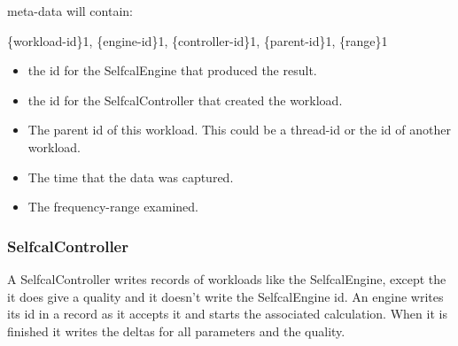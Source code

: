 \documentclass[]{lofar}
\begin{document}
     



      meta-data will contain:

     



      \{workload-id\}1, \{engine-id\}1, \{controller-id\}1, \{parent-id\}1, \{range\}1

      \begin{itemize}

	\item 


         the id for the SelfcalEngine that produced the result.

        


	\item 


         the id for the SelfcalController that created the workload.

        


	\item 


         The parent id of this workload. This could be a thread-id or
         the id of another workload.

        


	\item 


         The time that the data was captured.

        


	\item 


         The frequency-range examined.

        

\end{itemize}


\subsubsection{SelfcalController}
\label{id2721696}\hypertarget{id2721696}{}%



      A SelfcalController writes records of workloads like the
      SelfcalEngine, except the it does give a quality and it doesn't
      write the SelfcalEngine id. An engine writes its id in a record
      as it accepts it and starts the associated calculation. When it
      is finished it writes the deltas for all parameters and the
      quality.

     
\end{document}
